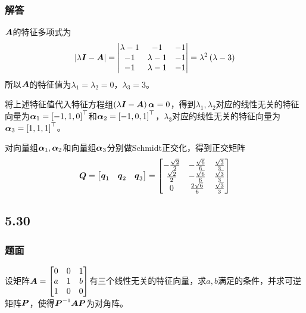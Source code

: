 \documentclass{beamer}
\begin{document}
\begin{frame}[allowframebreaks]
    \frametitle{解答}
    \(\boldsymbol{A}\)的特征多项式为
    \begin{equation*}
        \left|\lambda\boldsymbol{I}-\boldsymbol{A} \right|=\begin{vmatrix}\lambda-1&-1&-1\\-1&\lambda-1&-1\\-1&\lambda-1&-1\end{vmatrix}=\lambda^2\left( \lambda-3 \right)
    \end{equation*}
    所以\(\boldsymbol{A}\)的特征值为\(\lambda_1=\lambda_2=0\)，\(\lambda_3=3\)。

    将上述特征值代入特征方程组\(\left( \lambda\boldsymbol{I}-\boldsymbol{A} \right)\boldsymbol{\alpha}=0\)，得到\(\lambda_1,\lambda_2\)对应的线性无关的特征向量为\(\boldsymbol{\alpha}_1=\left[ -1,1,0 \right]^\top\)和\(\boldsymbol{\alpha}_2=\left[ -1,0,1 \right]^\top\)，\(\lambda_3\)对应的线性无关的特征向量为\(\boldsymbol{\alpha}_3=\left[ 1,1,1 \right]^\top\)。

    对向量组\(\boldsymbol{\alpha}_1,\boldsymbol{\alpha}_2\)和向量组\(\boldsymbol{\alpha}_3\)分别做Schmidt正交化，得到正交矩阵
    \begin{equation*}
        \boldsymbol{Q}=\begin{bmatrix}\boldsymbol{q}_1&\boldsymbol{q}_2&\boldsymbol{q}_3\end{bmatrix}=
        \begin{bmatrix}
            -\frac{\sqrt{2}}{2} & -\frac{\sqrt{6}}{6} & \frac{\sqrt{3}}{3} \\
            \frac{\sqrt{2}}{2}  & -\frac{\sqrt{6}}{6} & \frac{\sqrt{3}}{3} \\
            0                   & \frac{2\sqrt{6}}{6} & \frac{\sqrt{3}}{3}
        \end{bmatrix}
    \end{equation*}
\end{frame}

\subsection*{5.30}
\begin{frame}
    \frametitle{题面}
    设矩阵\(\boldsymbol{A}=\begin{bmatrix}0&0&1\\a&1&b\\1&0&0\end{bmatrix}\)有三个线性无关的特征向量，求\(a,b\)满足的条件，并求可逆矩阵\(\boldsymbol{P}\)，使得\({\boldsymbol{P}}^{-1}\boldsymbol{A}\boldsymbol{P}\)为对角阵。
\end{frame}
\end{document}
